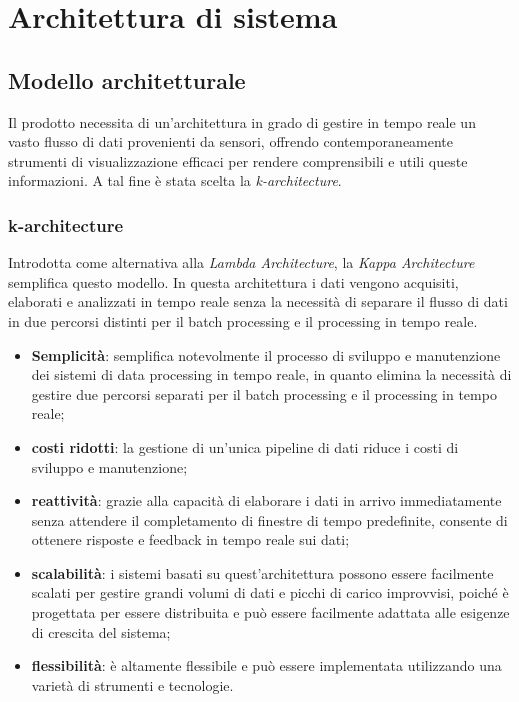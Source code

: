 \section{Architettura di sistema}
\subsection{Modello architetturale}
Il prodotto necessita di un'architettura in grado di gestire in tempo reale un vasto flusso di dati provenienti da sensori, offrendo contemporaneamente strumenti di visualizzazione efficaci per rendere comprensibili e utili queste informazioni. A tal fine è stata scelta la \textit{k-architecture}.
\subsubsection{k-architecture}
Introdotta come alternativa alla \textit{Lambda Architecture}, la \textit{Kappa Architecture} semplifica questo modello. In questa architettura i dati vengono acquisiti, elaborati e analizzati in tempo reale senza la necessità di separare il flusso di dati in due percorsi distinti per il batch processing e il processing in tempo reale.
\begin{itemize}
	\item \textbf{Semplicità}: semplifica notevolmente il processo di sviluppo e manutenzione dei sistemi di data processing in tempo reale, in quanto elimina la necessità di gestire due percorsi separati per il batch processing e il processing in tempo reale;
	\item \textbf{costi ridotti}: la gestione di un'unica pipeline di dati riduce i costi di sviluppo e manutenzione;
	\item \textbf{reattività}: grazie alla capacità di elaborare i dati in arrivo immediatamente senza attendere il completamento di finestre di tempo predefinite, consente di ottenere risposte e feedback in tempo reale sui dati;
	\item \textbf{scalabilità}: i sistemi basati su quest'architettura possono essere facilmente scalati per gestire grandi volumi di dati e picchi di carico improvvisi, poiché è progettata per essere distribuita e può essere facilmente adattata alle esigenze di crescita del sistema;
	\item \textbf{flessibilità}: è altamente flessibile e può essere implementata utilizzando una varietà di strumenti e tecnologie.
\end{itemize}
